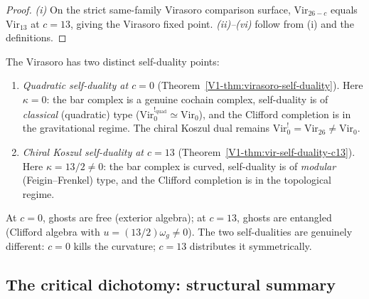 \begin{proof}
\emph{(i)} On the strict same-family Virasoro comparison surface,
$\mathrm{Vir}_{26-c}$ equals $\mathrm{Vir}_{13}$ at $c = 13$, giving
the Virasoro fixed point.
\emph{(ii)--(vi)} follow from (i) and the definitions.
\end{proof}

\begin{remark}
The Virasoro has two distinct self-duality points:
\begin{enumerate}[label=\textup{(\alph*)}]
\item \emph{Quadratic self-duality at $c = 0$}
(Theorem~\ref{V1-thm:virasoro-self-duality}). Here $\kappa = 0$: the bar
complex is a genuine cochain complex, self-duality is of \emph{classical}
(quadratic) type ($\mathrm{Vir}_0^{!_{\mathrm{quad}}} \simeq \mathrm{Vir}_0$),
and the Clifford completion is in the gravitational
regime. The chiral Koszul dual remains
$\mathrm{Vir}_0^! = \mathrm{Vir}_{26} \neq \mathrm{Vir}_0$.

\item \emph{Chiral Koszul self-duality at $c = 13$}
(Theorem~\ref{V1-thm:vir-self-duality-c13}). Here $\kappa = 13/2 \neq 0$:
the bar complex is curved, self-duality is of \emph{modular}
(Feigin--Frenkel) type, and the Clifford completion is in the topological
regime.
\end{enumerate}
At $c = 0$, ghosts are free (exterior algebra); at $c = 13$, ghosts
are entangled (Clifford algebra with $u = (13/2)\omega_g \neq 0$).
The two self-dualities are genuinely different: $c = 0$ kills the
curvature; $c = 13$ distributes it symmetrically.
\end{remark}

%
%

\subsection{The critical dichotomy: structural summary}

